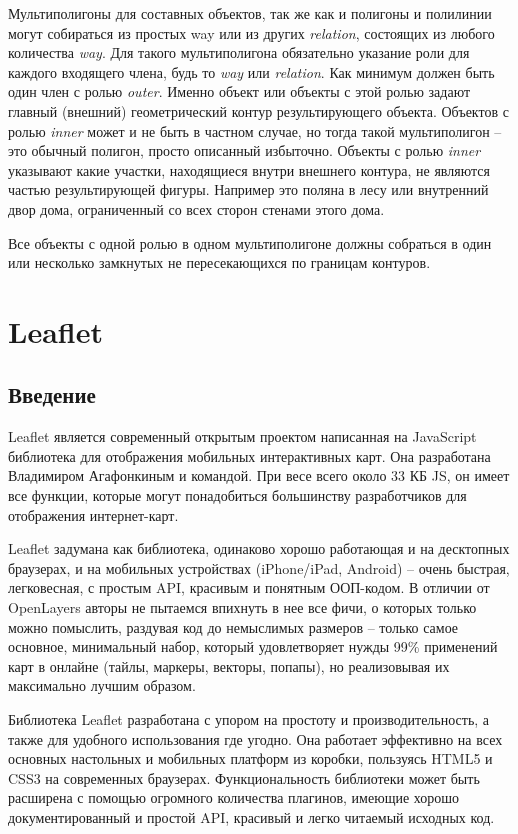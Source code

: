 Мультиполигоны для составных объектов, так же как и полигоны и полилинии могут 
собираться из простых way или из других \emph{relation}, состоящих из любого 
количества \emph{way}. Для такого мультиполигона обязательно указание роли для 
каждого входящего члена, будь то \emph{way} или \emph{relation}. Как минимум 
должен быть один член с ролью \emph{outer}. Именно объект или объекты с этой 
ролью задают главный (внешний) геометрический контур результирующего объекта. 
Объектов с ролью \emph{inner} может и не быть в частном случае, но тогда такой 
мультиполигон -- это обычный полигон, просто описанный избыточно. Объекты с 
ролью \emph{inner} указывают какие участки, находящиеся внутри внешнего 
контура, не являются частью результирующей фигуры. Например это поляна в лесу 
или внутренний двор дома, ограниченный со всех сторон стенами этого дома.

Все объекты с одной ролью в одном мультиполигоне должны собраться в один или 
несколько замкнутых не пересекающихся по границам контуров.\cite{habrahabr01}

\section{Leaflet}
\subsection{Введение}

Leaflet является современный открытым проектом написанная на JavaScript 
библиотека для отображения мобильных интерактивных карт. Она разработана 
Владимиром Агафонкиным и командой. При весе всего около 33 КБ JS, он имеет все 
функции, которые могут понадобиться большинству разработчиков для отображения 
интернет-карт.

Leaflet задумана как библиотека, одинаково хорошо работающая и на десктопных 
браузерах, и на мобильных устройствах (iPhone/iPad, Android) -- очень быстрая, 
легковесная, с простым API, красивым и понятным ООП-кодом. В отличии от 
OpenLayers\cite{openlayers} авторы не пытаемся впихнуть в нее все фичи, о 
которых только можно помыслить, раздувая код до немыслимых размеров -- 
только самое основное, минимальный набор, который удовлетворяет нужды 99\% 
применений карт в онлайне (тайлы, маркеры, векторы, попапы), но 
реализовывая их максимально лучшим образом.

Библиотека Leaflet разработана с упором на простоту и производительность, а 
также для удобного использования где угодно. Она работает эффективно на всех 
основных настольных и мобильных платформ из коробки, пользуясь HTML5 и CSS3 
на современных браузерах. Функциональность библиотеки может быть расширена 
с помощью огромного количества плагинов, имеющие хорошо документированный и 
простой API, красивый и легко читаемый исходных код.\cite{leaflet}

